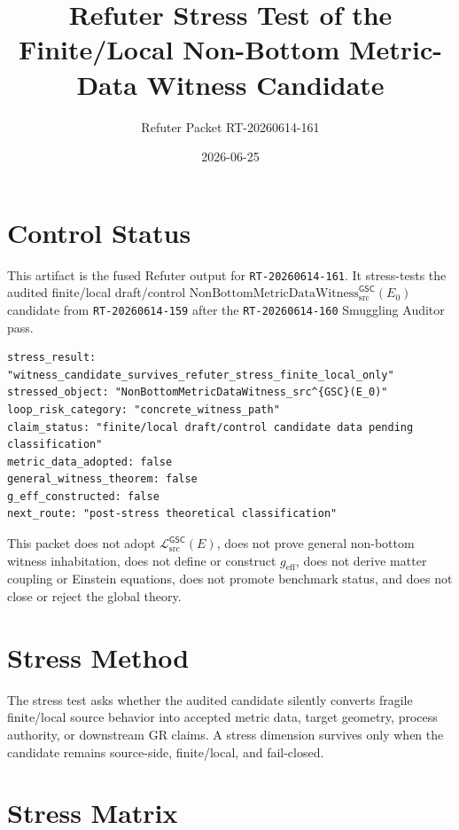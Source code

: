 \documentclass[11pt]{article}
\title{Refuter Stress Test of the Finite/Local Non-Bottom Metric-Data Witness Candidate}
\author{Refuter Packet RT-20260614-161}
\date{2026-06-25}
\newcommand{\Witness}{\mathrm{NonBottomMetricDataWitness}_{\mathrm{src}}^{\mathsf{GSC}}}
\newcommand{\MetricData}{\mathcal{L}_{\mathrm{src}}^{\mathsf{GSC}}}
\newcommand{\geff}{g_{\mathrm{eff}}}
\newcommand{\Ezero}{E_{0}}
\begin{document}
\maketitle

\section{Control Status}

This artifact is the fused Refuter output for \texttt{RT-20260614-161}. It
stress-tests the audited finite/local draft/control
\(\Witness(\Ezero)\) candidate from \texttt{RT-20260614-159} after the
\texttt{RT-20260614-160} Smuggling Auditor pass.

\begin{verbatim}
stress_result: "witness_candidate_survives_refuter_stress_finite_local_only"
stressed_object: "NonBottomMetricDataWitness_src^{GSC}(E_0)"
loop_risk_category: "concrete_witness_path"
claim_status: "finite/local draft/control candidate data pending classification"
metric_data_adopted: false
general_witness_theorem: false
g_eff_constructed: false
next_route: "post-stress theoretical classification"
\end{verbatim}

This packet does not adopt \(\MetricData(E)\), does not prove general
non-bottom witness inhabitation, does not define or construct \(\geff\), does
not derive matter coupling or Einstein equations, does not promote benchmark
status, and does not close or reject the global theory.

\section{Stress Method}

The stress test asks whether the audited candidate silently converts fragile
finite/local source behavior into accepted metric data, target geometry,
process authority, or downstream GR claims. A stress dimension survives only
when the candidate remains source-side, finite/local, and fail-closed.

\section{Stress Matrix}
\end{document}
